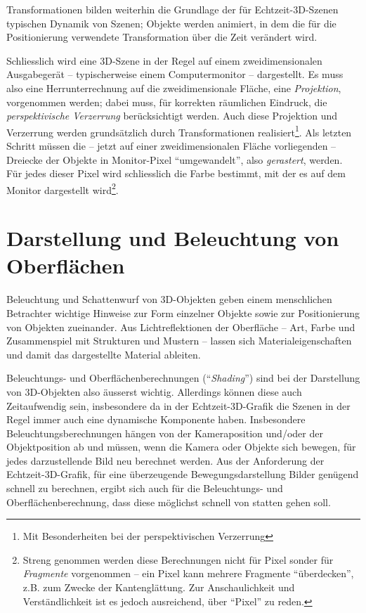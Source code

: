 \documentclass[twoside,a4paper,fleqn,12pt]{book}
\begin{document}
Transformationen bilden weiterhin die Grundlage der für Echtzeit-3D-Szenen typischen Dynamik von Szenen; Objekte werden animiert,
in dem die für die Positionierung verwendete Transformation über die Zeit verändert wird.

Schliesslich wird eine 3D-Szene in der Regel auf einem zweidimensionalen Ausgabegerät -- typischerweise einem Computermonitor --
dargestellt. Es muss also eine Herrunterrechnung auf die zweidimensionale Fläche, eine \emph{Projektion}, vorgenommen werden;
dabei muss, für korrekten räumlichen Eindruck, die \emph{perspektivische Verzerrung} berücksichtigt werden.
Auch diese Projektion und Verzerrung werden grundsätzlich durch Transformationen realisiert\footnote{Mit Besonderheiten bei der perspektivischen Verzerrung}.
Als letzten Schritt müssen die -- jetzt auf einer zweidimensionalen Fläche vorliegenden -- Dreiecke der Objekte
in Monitor-Pixel "`umgewandelt"', also \emph{gerastert}, werden. Für jedes dieser Pixel wird schliesslich die Farbe bestimmt,
mit der es auf dem Monitor dargestellt wird\footnote{Streng genommen werden diese Berechnungen nicht für Pixel sonder für \emph{Fragmente} vorgenommen --
ein Pixel kann mehrere Fragmente "`überdecken"', z.B. zum Zwecke der Kantenglättung. Zur Anschaulichkeit und Verständlichkeit ist es jedoch
ausreichend, über "`Pixel"' zu reden.}.

\section{Darstellung und Beleuchtung von Oberflächen}
\label{surface_and_shading}

Beleuchtung und Schattenwurf von 3D-Objekten geben einem menschlichen Betrachter wichtige Hinweise zur Form
einzelner Objekte sowie zur Positionierung von Objekten zueinander. Aus Lichtreflektionen der Oberfläche -- Art, Farbe und Zusammenspiel
mit Strukturen und Mustern -- lassen sich Materialeigenschaften und damit das dargestellte Material ableiten.

Beleuchtungs- und Oberflächenberechnungen (``\emph{\gls{Shading}}'') sind bei der Darstellung von 3D-Objekten also äusserst wichtig.
Allerdings können diese auch Zeitaufwendig sein, insbesondere da in der Echtzeit-3D-Grafik die Szenen in der Regel
immer auch eine dynamische Komponente haben. Insbesondere Beleuchtungsberechnungen hängen von der Kameraposition
und/oder der Objektposition ab und müssen, wenn die Kamera oder Objekte sich bewegen, für jedes darzustellende Bild
neu berechnet werden. Aus der Anforderung der Echtzeit-3D-Grafik, für eine überzeugende Bewegungsdarstellung
Bilder genügend schnell zu berechnen, ergibt sich auch für die Beleuchtungs- und Oberflächenberechnung, dass diese
möglichst schnell von statten gehen soll.
\end{document}
